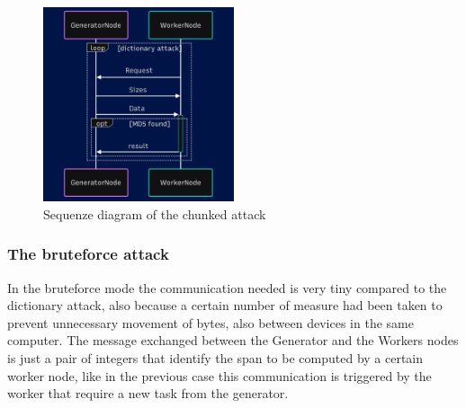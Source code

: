\documentclass[12pt,a4paper]{article}
\begin{document}
\begin{figure}
    \includegraphics[width=0.5\textwidth]{images/chunk_workflow.png}
    \caption{Sequenze diagram of the chunked attack}    
\end{figure}

\subsubsection{The bruteforce attack}
In the bruteforce mode the communication needed is very tiny compared to the dictionary attack, also because a certain number of measure had been taken to prevent unnecessary movement of bytes, also between devices in the same computer. The message exchanged between the Generator and the Workers nodes is just a pair of integers that identify the span to be computed by a certain worker node, like in the previous case this communication is triggered by the worker that require a new task from the generator.



\printbibliography
\end{document}
